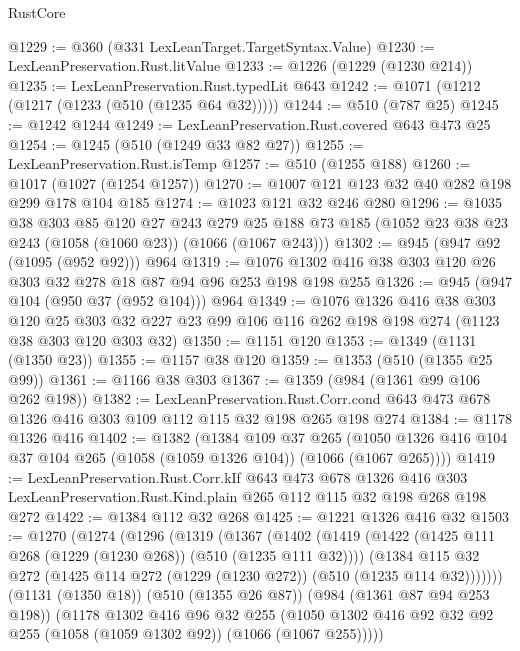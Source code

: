 \begin{lexlean}{RustCore}
\begin{coremodule}
@1229 := @360 (@331 LexLeanTarget.TargetSyntax.Value)
@1230 := LexLeanPreservation.Rust.litValue
@1233 := @1226 (@1229 (@1230 @214))
@1235 := LexLeanPreservation.Rust.typedLit @643
@1242 := @1071 (@1212 (@1217 (@1233 (@510 (@1235 @64 @32)))))
@1244 := @510 (@787 @25)
@1245 := @1242 @1244
@1249 := LexLeanPreservation.Rust.covered @643 @473 @25
@1254 := @1245 (@510 (@1249 @33 @82 @27))
@1255 := LexLeanPreservation.Rust.isTemp
@1257 := @510 (@1255 @188)
@1260 := @1017 (@1027 (@1254 @1257))
@1270 := @1007 @121 @123 @32 @40 @282 @198 @299 @178 @104 @185
@1274 := @1023 @121 @32 @246 @280
@1296 := @1035
    @38
    @303
    @85
    @120
    @27
    @243
    @279
    @25
    @188
    @73
    @185
    (@1052 @23 @38 @23 @243 (@1058 (@1060 @23)) (@1066 (@1067 @243)))
@1302 := @945 (@947 @92 (@1095 (@952 @92))) @964
@1319 := @1076 @1302 @416 @38 @303 @120 @26 @303 @32 @278 @18 @87 @94 @96 @253 @198 @198 @255
@1326 := @945 (@947 @104 (@950 @37 (@952 @104))) @964
@1349 := @1076
    @1326
    @416
    @38
    @303
    @120
    @25
    @303
    @32
    @227
    @23
    @99
    @106
    @116
    @262
    @198
    @198
    @274
    (@1123 @38 @303 @120 @303 @32)
@1350 := @1151 @120
@1353 := @1349 (@1131 (@1350 @23))
@1355 := @1157 @38 @120
@1359 := @1353 (@510 (@1355 @25 @99))
@1361 := @1166 @38 @303
@1367 := @1359 (@984 (@1361 @99 @106 @262 @198))
@1382 := LexLeanPreservation.Rust.Corr.cond
    @643
    @473
    @678
    @1326
    @416
    @303
    @109
    @112
    @115
    @32
    @198
    @265
    @198
    @274
@1384 := @1178 @1326 @416
@1402 := @1382
    (@1384
      @109
      @37
      @265
      (@1050 @1326 @416 @104 @37 @104 @265 (@1058 (@1059 @1326 @104)) (@1066 (@1067 @265))))
@1419 := LexLeanPreservation.Rust.Corr.kIf
    @643
    @473
    @678
    @1326
    @416
    @303
    LexLeanPreservation.Rust.Kind.plain
    @265
    @112
    @115
    @32
    @198
    @268
    @198
    @272
@1422 := @1384 @112 @32 @268
@1425 := @1221 @1326 @416 @32
@1503 := @1270
    (@1274
      (@1296
        (@1319
          (@1367
            (@1402
              (@1419
                (@1422 (@1425 @111 @268 (@1229 (@1230 @268)) (@510 (@1235 @111 @32))))
                (@1384
                  @115
                  @32
                  @272
                  (@1425 @114 @272 (@1229 (@1230 @272)) (@510 (@1235 @114 @32)))))))
          (@1131 (@1350 @18))
          (@510 (@1355 @26 @87))
          (@984 (@1361 @87 @94 @253 @198))
          (@1178
            @1302
            @416
            @96
            @32
            @255
            (@1050 @1302 @416 @92 @32 @92 @255 (@1058 (@1059 @1302 @92)) (@1066 (@1067 @255)))))

\end{coremodule}
\end{lexlean}
